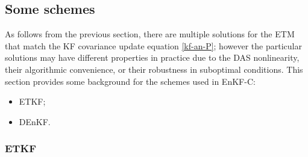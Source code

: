 \documentclass[11pt]{report}
\begin{document}
\subsection{Some schemes}

As follows from the previous section, there are multiple solutions for the ETM that match the KF covariance update equation \eqref{kf-an-P}; however the particular solutions may have different properties in practice due to the DAS nonlinearity, their algorithmic convenience, or their robustness in suboptimal conditions.
This section provides some background for the schemes used in EnKF-C:
\begin{itemize}
\item ETKF;
\item DEnKF.
\end{itemize}

\subsubsection{ETKF}
\end{document}
